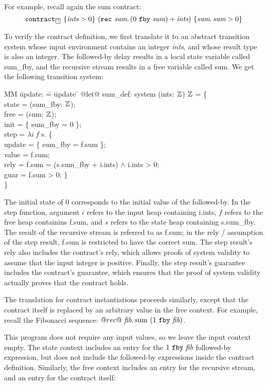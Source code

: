 For example, recall again the sum contract:
$$
\sumcontractX{\PSUnknown}{\textit{ints}}
$$

To verify the contract definition, we first translate it to an abstract transition system whose input environment contains an integer \emph{ints}, and whose result type is also an integer.
The followed-by delay results in a local state variable called sum_fby, and the recursive stream results in a free variable called sum.
We get the following transition system:

  \begin{tabbing}
  MM \= update: \= = \= update \= \kill
  @let@ sum_def: system (ints: $\mathbb{Z}$) $\mathbb{Z}$ = \{ \\
  \> state   \> = (sum_fby: $\mathbb{Z}$); \\
  \> free  \> = (sum: $\mathbb{Z}$); \\
  \> init  \> = \{ sum_fby = 0 \}; \\
  \> step  \> = $\lambda{} i~f~s.$ \{ \\
  \> \> \> update \> = \{ sum_fby = f.sum \}; \\
  \> \> \> value  \> = f.sum; \\
  \> \> \> rely   \> = f.sum = (s.sum_fby + i.ints) $\wedge$ i.ints > 0; \\
  \> \> \> guar   \> = f.sum > 0; \} \\
  \} \\
  \end{tabbing}

The initial state of 0 corresponds to the initial value of the followed-by.
In the step function, argument $i$ refers to the input heap containing i.ints, $f$ refers to the free heap containins f.sum, and $s$ refers to the state heap containing s.sum_fby.
The result of the recursive stream is referred to as f.sum; in the rely / assumption of the step result, f.sum is restricted to have the correct sum.
The step result's rely also includes the contract's rely, which allows proofs of system validity to assume that the input integer is positive.
Finally, the step result's guarantee includes the contract's guarantee, which ensures that the proof of system validity actually proves that the contract holds.

The translation for contract instantiations proceeds similarly, except that the contract itself is replaced by an arbitrary value in the free context.
For example, recall the Fibonacci sequence:
$
  @rec@~\textit{fib}.\, \text{sum}~(1~\texttt{fby}~\textit{fib})
$.

This program does not require any input values, so we leave the input context empty.
The state context includes an entry for the $1~\texttt{fby}~\textit{fib}$ followed-by expression, but does not include the followed-by expressions inside the contract definition.
Similarly, the free context includes an entry for the recursive stream, and an entry for the contract itself:


